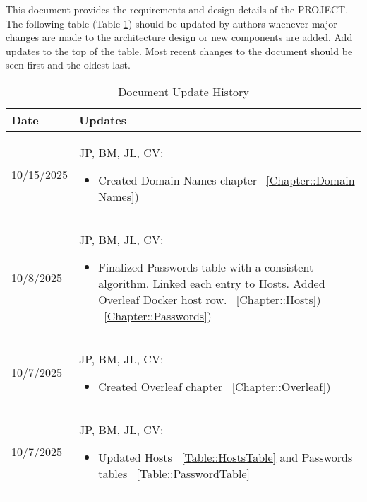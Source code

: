 This document provides the requirements and design details of the
PROJECT.  The following table (Table \ref{Table::UpdateHistory}) should be
updated by authors whenever major changes are made to the architecture
design or new components are added. Add updates to the top of the table.  
Most recent changes to the document should be seen first and the oldest 
last.


\begin{longtable}{|l||p{13.5cm}|}
\caption{Document Update History \label{Table::UpdateHistory}}\\
\hline
\textbf{Date} & \textbf{Updates} \\
\hline 
\endhead

10/15/2025 & JP, BM, JL, CV:
\begin{itemize}[topsep=0pt,itemsep=0pt,parsep=0pt,partopsep=0pt,leftmargin=12pt]
\item Created Domain Names chapter
~\ref{Chapter::Domain Names})
\end{itemize} 
\\ \hline

10/8/2025 & JP, BM, JL, CV:
\begin{itemize}[topsep=0pt,itemsep=0pt,parsep=0pt,partopsep=0pt,leftmargin=12pt]
\item Finalized Passwords table with a consistent algorithm. Linked each entry to Hosts. Added Overleaf Docker host row.
~\ref{Chapter::Hosts})
~\ref{Chapter::Passwords})
\end{itemize} 
\\ \hline

10/7/2025 & JP, BM, JL, CV:
\begin{itemize}[topsep=0pt,itemsep=0pt,parsep=0pt,partopsep=0pt,leftmargin=12pt]
\item Created Overleaf chapter
~\ref{Chapter::Overleaf})
\end{itemize} 
\\ \hline

10/7/2025 & JP, BM, JL, CV:
\begin{itemize}[topsep=0pt,itemsep=0pt,parsep=0pt,partopsep=0pt,leftmargin=12pt]
\item Updated Hosts ~\ref{Table::HostsTable} and Passwords tables
 ~\ref{Table::PasswordTable} 
\end{itemize} 
\\ \hline


\end{longtable}

